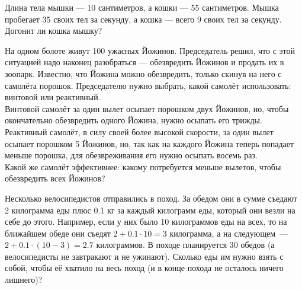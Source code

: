 ﻿
\begin{enumerate}
\itA Длина тела мышки — 10 сантиметров, а кошки — 55 сантиметров. Мышка пробегает 35 своих тел за секунду, а кошка — всего 9 своих тел за секунду. Догонит ли кошка мышку?

\itB На одном болоте живут 100 ужасных Йожинов. Председатель решил, что с этой ситуацией надо наконец разобраться — обезвредить Йожинов и продать их в зоопарк. Известно, что Йожина можно обезвредить, только скинув на него с самолёта порошок. Председателю нужно выбрать, какой самолёт использовать: винтовой или реактивный. \smallskip \\
Винтовой самолёт за один вылет осыпает порошком двух Йожинов, но, чтобы окончательно обезвредить одного Йожина, нужно осыпать его трижды. Реактивный самолёт, в силу своей более высокой скорости, за один вылет осыпает порошком 5 Йожинов, но, так как на каждого Йожина теперь попадает меньше порошка, для обезвреживания его нужно осыпать восемь раз. \smallskip \\
Какой же самолёт эффективнее: какому потребуется меньше вылетов, чтобы обезвредить всех Йожинов?

\itC Несколько велосипедистов отправились в поход. За обедом они в сумме съедают 2 килограмма еды плюс 0.1 кг за каждый килограмм еды, который они везли на себе до этого. Например, если у них было 10 килограммов еды на всех, то на ближайшем обеде они съедят $2 + 0.1 \cdot 10 = 3$ килограмма, а на следующем~— $2 + 0.1 \cdot (10-3) = 2.7$ килограммов. В походе планируется 30 обедов (а велосипедисты не завтракают и не ужинают). Сколько еды им нужно взять с собой, чтобы её хватило на весь поход (и в конце похода не осталось ничего лишнего)?
\end{enumerate}